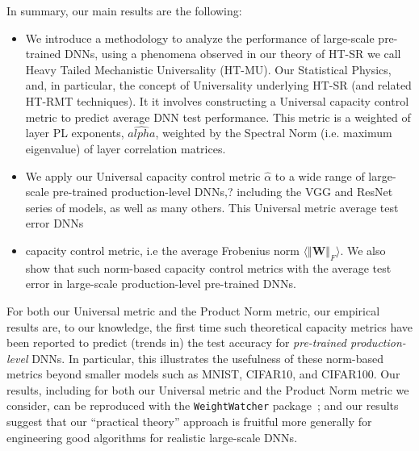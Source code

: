 In summary, our main results are the following:


\begin{itemize}
\item
We introduce a  methodology to analyze the performance of large-scale pre-trained DNNs,
using a phenomena observed in our theory of HT-SR we call Heavy Tailed Mechanistic Universality (HT-MU).
Our  Statistical Physics, and, in particular, the concept of Universality underlying HT-SR (and related HT-RMT techniques).
It it involves constructing a Universal capacity control metric to predict average DNN test performance.
This metric is a weighted  of layer PL exponents, $\hat{alpha}$, weighted by the Spectral Norm
(i.e. maximum eigenvalue) of layer correlation matrices. 
\item
We apply our Universal capacity control metric $\hat{\alpha}$ to a wide range of large-scale pre-trained production-level DNNs,?
 including the VGG and ResNet series of models, as well as many others.
This Universal metric  average test error  DNNs
\item
{} capacity control metric, i.e
the average Frobenius norm $\langle\Vert\mathbf{W}\Vert_{F}\rangle$.
We also show that
such norm-based capacity control metrics  with the average test error in large-scale production-level pre-trained DNNs.
\end{itemize}



For both our Universal metric and the Product Norm metric, our empirical results are, to our knowledge, the first time such theoretical capacity metrics have been reported to predict (trends in) the test accuracy for \emph{pre-trained production-level} DNNs.
In particular, this illustrates the usefulness of these norm-based metrics beyond smaller models such as MNIST, CIFAR10, and CIFAR100. 
Our 
results, including for both our Universal metric and the Product Norm metric we consider, can be reproduced with the \texttt{WeightWatcher} package~\cite{weightwatcher_pagkage}; and our
results suggest that our ``practical theory'' approach is fruitful more generally for engineering good algorithms for realistic large-scale DNNs.


